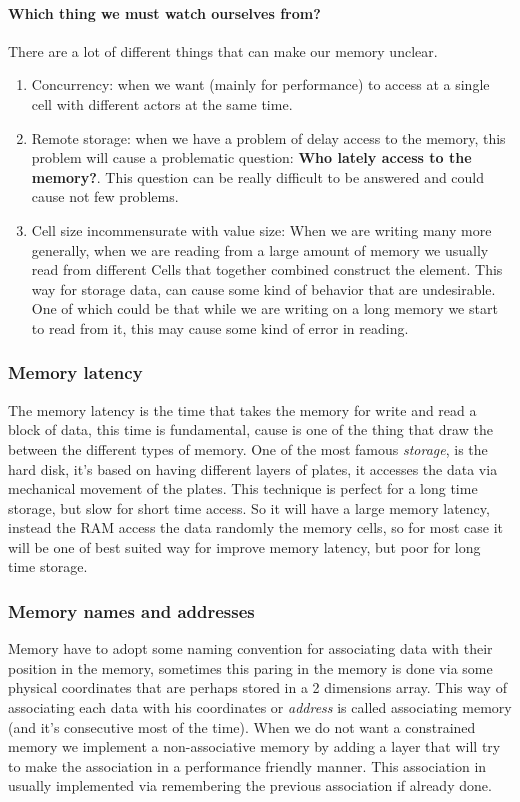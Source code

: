 \documentclass{article}
\begin{document}
        \paragraph{Which thing we must watch ourselves from?} There are a lot of different 
          things that can make our memory unclear. 
          \begin{enumerate}
            \item Concurrency: when we want (mainly for performance) to access
              at a single cell with different actors at the same time.
            \item Remote storage: when we have a problem of delay access to the memory,
              this problem will cause a problematic question: \textbf{Who lately access to 
              the memory?}. This question can be really difficult to be answered and could cause 
              not few problems. 
            \item Cell size incommensurate with value size: When we are writing many more 
              generally, when we are reading from a large amount of memory we usually 
              read from different Cells that together combined construct the element. This way 
              for storage data, can cause some kind of behavior that are undesirable. One of 
              which could be that while we are writing on a long memory we start to read from
              it, this may cause some kind of error in reading. 
          \end{enumerate}
      \subsubsection{Memory latency}
        The memory latency is the time that takes the memory for write and read a
        block of data, this time is fundamental, cause is one of the thing that draw the
        between the different types of memory. One of the most famous \textit{storage}, is
        the hard disk, it's based on having different layers of plates, it accesses the data
        via mechanical movement of the plates. This technique is perfect for a long 
        time storage, but slow for short time access. So it will have a large memory latency, 
        instead the RAM access the data randomly the memory cells, so for most case
        it will be one of best suited way for improve memory latency, but poor for long time
        storage.
      \subsubsection{Memory names and addresses}
        Memory have to adopt some naming convention for associating data with their position
        in the memory, sometimes this paring in the memory is done via some physical coordinates
        that are perhaps stored in a 2 dimensions array. This way of associating each data
        with his coordinates or \textit{address} is called associating memory (and it's 
        consecutive most of the time). When we do not want a constrained memory we implement
        a non-associative memory by adding a layer that will try to make the association in
        a performance friendly manner. This association in usually implemented via remembering
        the previous association if already done.
\end{document}
